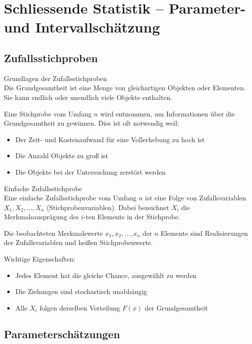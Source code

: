 \section{Schliessende Statistik -- Parameter- und Intervallschätzung}

\subsection{Zufallsstichproben}

\begin{concept}{Grundlagen der Zufallsstichproben}\\
Die Grundgesamtheit ist eine Menge von gleichartigen Objekten oder Elementen. Sie kann endlich oder unendlich viele Objekte enthalten.

Eine Stichprobe vom Umfang $n$ wird entnommen, um Informationen über die Grundgesamtheit zu gewinnen. Dies ist oft notwendig weil:
\begin{itemize}
  \item Der Zeit- und Kostenaufwand für eine Vollerhebung zu hoch ist
  \item Die Anzahl Objekte zu groß ist
  \item Die Objekte bei der Untersuchung zerstört werden
\end{itemize}
\end{concept}

\begin{definition}{Einfache Zufallsstichprobe}\\
Eine einfache Zufallsstichprobe vom Umfang $n$ ist eine Folge von Zufallsvariablen $X_1, X_2, \ldots, X_n$ (Stichprobenvariablen). Dabei bezeichnet $X_i$ die Merkmalsausprägung des $i$-ten Elements in der Stichprobe.

Die beobachteten Merkmalswerte $x_1, x_2, \ldots, x_n$ der $n$ Elemente sind Realisierungen der Zufallsvariablen und heißen Stichprobenwerte.

Wichtige Eigenschaften:
\begin{itemize}
  \item Jedes Element hat die gleiche Chance, ausgewählt zu werden
  \item Die Ziehungen sind stochastisch unabhängig 
  \item Alle $X_i$ folgen derselben Verteilung $F(x)$ der Grundgesamtheit
\end{itemize}
\end{definition}

\subsection{Parameterschätzungen}

